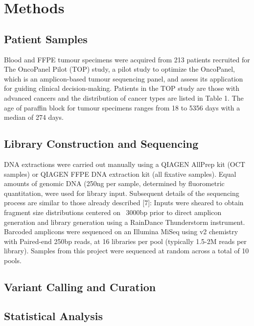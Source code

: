 \documentclass{bmcart}
\begin{document}

\section*{Methods}

\subsection*{Patient Samples}
Blood and FFPE tumour specimens were acquired from 213 patients recruited for The OncoPanel Pilot (TOP) study, a pilot study to optimize the OncoPanel, which is an amplicon-based tumour sequencing panel, and assess its application for guiding clinical decision-making. Patients in the TOP study are those with advanced cancers and the distribution of cancer types are listed in Table 1. The age of paraffin block for tumour specimens ranges from 18 to 5356 days with a median of 274 days.

\subsection*{Library Construction and Sequencing}
DNA extractions were carried out manually using a QIAGEN AllPrep kit (OCT samples) or QIAGEN FFPE DNA extraction kit (all fixative samples). Equal amounts of genomic DNA (250ng per sample, determined by fluorometric quantitation, were used for library input. Subsequent details of the sequencing process are similar to those already described [7]: Inputs were sheared to  obtain fragment size distributions centered on ~3000bp prior to direct amplicon generation and library generation using a RainDance Thunderstorm instrument. Barcoded amplicons were sequenced on an Illumina MiSeq using v2 chemistry with Paired-end 250bp reads, at 16 libraries per pool (typically 1.5-2M reads per library). Samples from this project were sequenced at random across a total of 10 pools.

\subsection*{Variant Calling and Curation}




\subsection*{Statistical Analysis}
\end{document}
